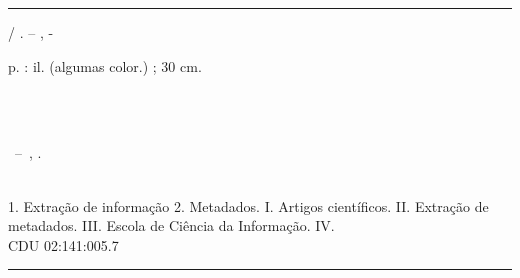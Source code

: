\documentclass[
	12pt,               %
	openright,          %
	oneside,            %
	a4paper,            %
	english,            %
	brazil              %
	]{abntex2}
\begin{document}
\frenchspacing 


\imprimircapa

\imprimirfolhaderosto*


%
%     
\begin{fichacatalografica}
	\vspace*{\fill}                 %
	\hrule                          %
	\begin{center}                  %
	\begin{minipage}[c]{12.5cm}     %
	
	\imprimirautor
	
	\hspace{0.5cm} \imprimirtitulo  / \imprimirautor. --
	\imprimirlocal, \imprimirdata-
	
	\hspace{0.5cm} \pageref{LastPage} p. : il. (algumas color.) ; 30 cm.\\
	
	\hspace{0.5cm} 
	
	\imprimirorientadorRotulo~\imprimirorientador\\
	\imprimircoorientadorRotulo~\imprimircoorientador\\
	
	\hspace{0.5cm}
	\parbox[t]{\textwidth}{\imprimirtipotrabalho~--~\imprimirinstituicao,
	\imprimirdata.}\\
	
	\hspace{0.5cm}
		1. Extração de informação
		2. Metadados.
		I. Artigos científicos.
		II. Extração de metadados.
		III. Escola de Ciência da Informação.
		IV. \imprimirtitulo\\            
	
	\hspace{8.75cm} CDU 02:141:005.7\\
	
	\end{minipage}
	\end{center}
	\hrule
\end{fichacatalografica}
\end{document}

